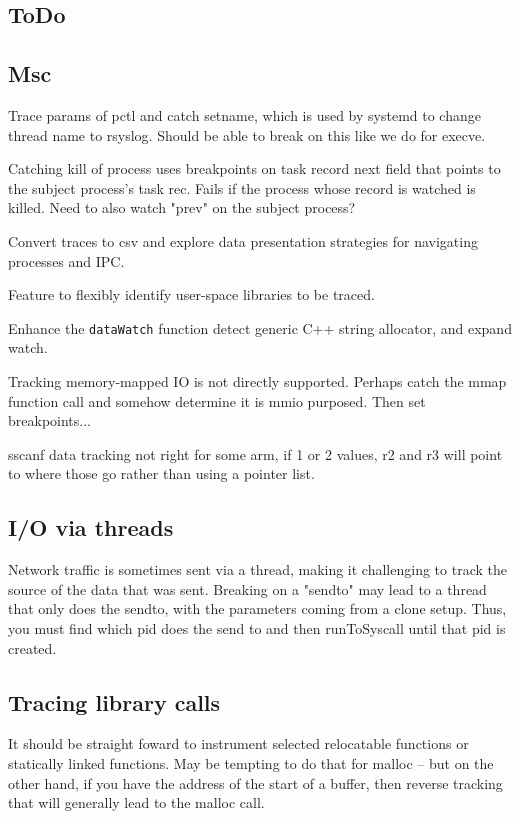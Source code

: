 \documentclass[titlepage]{article}
\begin{document}
\begin{appendices}
\section{ToDo}
\subsection {Msc}
Trace params of pctl and catch setname, which is used by systemd to change thread name to rsyslog.  Should be able to 
break on this like we do for execve.

Catching kill of process uses breakpoints on task record next field that points to the subject process's task rec.  Fails if the
process whose record is watched is killed.  Need to also watch "prev" on the subject process?

Convert traces to csv and explore data presentation strategies for navigating processes and IPC.

Feature to flexibly identify user-space libraries to be traced.

Enhance the {\tt dataWatch} function detect generic C++ string allocator, and expand watch.

Tracking memory-mapped IO is not directly supported.  Perhaps catch the mmap function call and somehow determine it is mmio purposed.  Then
set breakpoints...

sscanf data tracking not right for some arm, if 1 or 2 values, r2 and r3 will point to where those go rather than using a pointer list.

\subsection{I/O via threads}
Network traffic is sometimes sent via a thread, making it challenging to track the source of the data that was sent.  Breaking on a "sendto" may
lead to a thread that only does the sendto, with the parameters coming from a clone setup.  Thus, you must find which pid does the send to and then
runToSyscall until that pid is created.

\subsection{Tracing library calls}
It should be straight foward to instrument selected relocatable functions or statically linked functions.
May be tempting to do that for malloc -- but on the other hand, if you have the address of the start of a buffer, then reverse tracking that
will generally lead to the malloc call.



\end{appendices}
\end{document}
